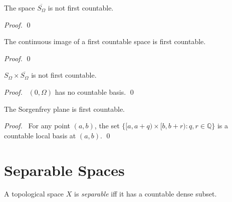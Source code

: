   \begin{prop}
    \label{prop:topology:first_countable:S_omega}
  The space $\overline{S_\Omega}$ is not first countable.
\end{prop}

\begin{proof}
 \pf
 \qed
\end{proof}

\begin{prop}
 The continuous image of a first countable space is first countable.
\end{prop}

\begin{proof}
  \pf
  \qed
\end{proof}

\begin{prop}
 $S_\Omega \times \overline{S_\Omega}$ is not first countable.
\end{prop}

\begin{proof}
\pf\ $(0, \Omega)$ has no countable basis. \qed
\end{proof}

\begin{prop}
The Sorgenfrey plane is first countable.
\end{prop}

\begin{proof}
 \pf\ For any point $(a,b)$, the set $\{ [a, a + q) \times [b, b + r) : q, r
 \in \mathbb{Q} \}$ is a countable local basis at $(a,b)$. \qed
\end{proof}


\section{Separable Spaces}

  \begin{df}
  A topological space $X$ is \emph{separable} iff it has a countable dense
  subset.
\end{df}

